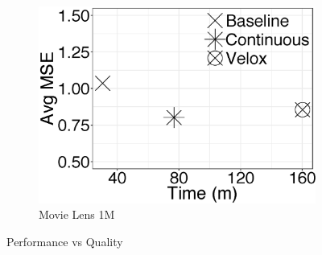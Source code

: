 \documentclass{vldb}
\begin{document}
\begin{figure}[h]
\begin{subfigure}{0.30\textwidth}
  \includegraphics[width=1\linewidth, height=1\linewidth, keepaspectratio]{../images/experiment-results/movie-lens-1m-meta-performance.eps}
  \caption{Movie Lens 1M}
  \label{fig:sfig1}
\end{subfigure}

\caption{Performance vs Quality}
\label{fig:fig}
\end{figure}
\end{document}
